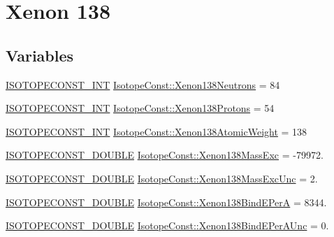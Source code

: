 \hypertarget{group___isotope_const-_xenon-_xe138}{}\section{Xenon 138}
\label{group___isotope_const-_xenon-_xe138}
\subsection*{Variables}
\begin{DoxyCompactItemize}
\item 
\mbox{\hyperlink{group___isotope_const-_macros_ga5f18360b3e99483a35c32d789e62621c}{I\+S\+O\+T\+O\+P\+E\+C\+O\+N\+S\+T\+\_\+\+I\+NT}} \mbox{\hyperlink{group___isotope_const-_xenon-_xe138_gae66b435c48d1a463b5fdab107016fa10}{Isotope\+Const\+::\+Xenon138\+Neutrons}} = 84
\item 
\mbox{\hyperlink{group___isotope_const-_macros_ga5f18360b3e99483a35c32d789e62621c}{I\+S\+O\+T\+O\+P\+E\+C\+O\+N\+S\+T\+\_\+\+I\+NT}} \mbox{\hyperlink{group___isotope_const-_xenon-_xe138_ga6c6fa5a310466099f0466fcdbf9faf59}{Isotope\+Const\+::\+Xenon138\+Protons}} = 54
\item 
\mbox{\hyperlink{group___isotope_const-_macros_ga5f18360b3e99483a35c32d789e62621c}{I\+S\+O\+T\+O\+P\+E\+C\+O\+N\+S\+T\+\_\+\+I\+NT}} \mbox{\hyperlink{group___isotope_const-_xenon-_xe138_gaa072842e29cc1d257b83290425cf8dd2}{Isotope\+Const\+::\+Xenon138\+Atomic\+Weight}} = 138
\item 
\mbox{\hyperlink{group___isotope_const-_macros_ga8f45a7272ce02c0b4c65c44636ed719a}{I\+S\+O\+T\+O\+P\+E\+C\+O\+N\+S\+T\+\_\+\+D\+O\+U\+B\+LE}} \mbox{\hyperlink{group___isotope_const-_xenon-_xe138_ga398ebad9f25bbeaff7e061c04f24820b}{Isotope\+Const\+::\+Xenon138\+Mass\+Exc}} = -\/79972.
\item 
\mbox{\hyperlink{group___isotope_const-_macros_ga8f45a7272ce02c0b4c65c44636ed719a}{I\+S\+O\+T\+O\+P\+E\+C\+O\+N\+S\+T\+\_\+\+D\+O\+U\+B\+LE}} \mbox{\hyperlink{group___isotope_const-_xenon-_xe138_gacf1740a4d56273d8506b43c90dd4757d}{Isotope\+Const\+::\+Xenon138\+Mass\+Exc\+Unc}} = 2.
\item 
\mbox{\hyperlink{group___isotope_const-_macros_ga8f45a7272ce02c0b4c65c44636ed719a}{I\+S\+O\+T\+O\+P\+E\+C\+O\+N\+S\+T\+\_\+\+D\+O\+U\+B\+LE}} \mbox{\hyperlink{group___isotope_const-_xenon-_xe138_ga655ee6fb34ffaa8a74b4888d2879ce6a}{Isotope\+Const\+::\+Xenon138\+Bind\+E\+PerA}} = 8344.
\item 
\mbox{\hyperlink{group___isotope_const-_macros_ga8f45a7272ce02c0b4c65c44636ed719a}{I\+S\+O\+T\+O\+P\+E\+C\+O\+N\+S\+T\+\_\+\+D\+O\+U\+B\+LE}} \mbox{\hyperlink{group___isotope_const-_xenon-_xe138_gabf9cb38e723a131a6443a84b5974d67a}{Isotope\+Const\+::\+Xenon138\+Bind\+E\+Per\+A\+Unc}} = 0.

\end{DoxyCompactItemize}
